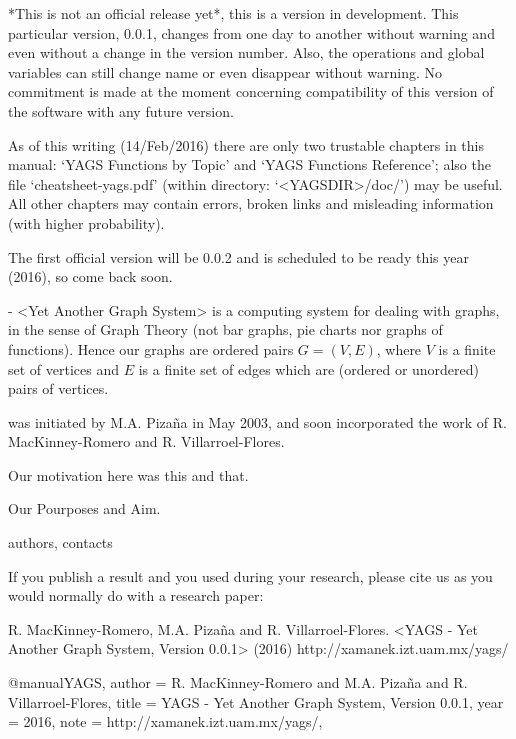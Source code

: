 

*This is not an official release yet*, this is a version in development. 
This particular version, 0.0.1, changes from one day to another without warning 
and even without a change in the version number. Also, the operations and 
global variables can still change name or even disappear without warning. 
No commitment is made at the moment concerning compatibility of this version of 
the software with any future version.

As of this writing (14/Feb/2016) there are only two trustable chapters in this manual: 
`YAGS Functions by Topic' and  `YAGS Functions Reference'; also the file 
`cheatsheet-yags.pdf' (within directory: `<YAGSDIR>/doc/') may be useful. 
All other chapters may contain errors, broken links and misleading information (with higher probability).

The first official version will be 0.0.2 and is scheduled to be ready this year (2016), 
so come back soon.



{\YAGS} - <Yet Another Graph System> is a computing system for dealing with graphs, in the sense of Graph Theory (not bar graphs, pie charts nor graphs of functions). Hence our graphs are ordered pairs $G=(V,E)$, where 
$V$ is a finite set of vertices and $E$ is a finite set of edges which are (ordered or unordered) pairs of vertices.

{\YAGS} was initiated by M.A. Piza{\~n}a in May 2003, and soon incorporated the work of R. MacKinney-Romero and R. Villarroel-Flores.

Our motivation here was this and that.

Our Pourposes and Aim.

authors, contacts



If you publish a result and you used {\YAGS} during your research, please cite us as you would normally do with a research paper:

R. MacKinney-Romero, M.A. Piza{\~n}a and R. Villarroel-Flores.\newline
<YAGS - Yet Another Graph System, Version 0.0.1> (2016)\newline
http://xamanek.izt.uam.mx/yags/

\begintt
@manual{YAGS,
author = {R. MacKinney-Romero and M.A. Piza{\~n}a and R. Villarroel-Flores},
 title = {YAGS - Yet Another Graph System, Version 0.0.1},
  year = {2016},
  note = {http://xamanek.izt.uam.mx/yags/},
}
\endtt

